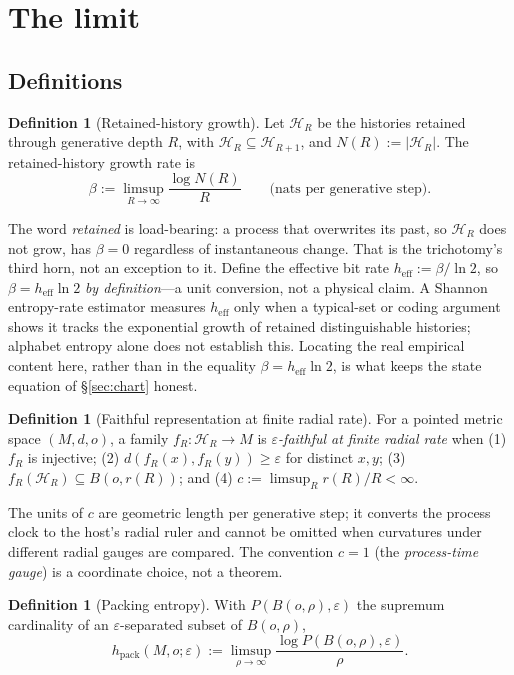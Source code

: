 \documentclass[11pt,reqno]{amsart}
\theoremstyle{plain}
\theoremstyle{definition}
\newtheorem{definition}[theorem]{Definition}
\newcommand{\hpack}{h_{\mathrm{pack}}}
\newcommand{\heff}{h_{\mathrm{eff}}}
\newcommand{\eps}{\varepsilon}
\begin{document}
\section{The limit}\label{sec:limit}

\subsection{Definitions}

\begin{definition}[Retained-history growth]
Let $\mathcal H_R$ be the histories retained through generative depth $R$, with $\mathcal H_R\subseteq\mathcal H_{R+1}$, and $N(R):=|\mathcal H_R|$. The retained-history growth rate is
\[
\beta:=\limsup_{R\to\infty}\frac{\log N(R)}{R}\qquad\text{(nats per generative step).}
\]
\end{definition}

The word \emph{retained} is load-bearing: a process that overwrites its past, so $\mathcal H_R$ does not grow, has $\beta=0$ regardless of instantaneous change. That is the trichotomy's third horn, not an exception to it. Define the effective bit rate $\heff:=\beta/\ln2$, so $\beta=\heff\ln2$ \emph{by definition}---a unit conversion, not a physical claim. A Shannon entropy-rate estimator measures $\heff$ only when a typical-set or coding argument shows it tracks the exponential growth of retained distinguishable histories; alphabet entropy alone does not establish this. Locating the real empirical content here, rather than in the equality $\beta=\heff\ln2$, is what keeps the state equation of \S\ref{sec:chart} honest.

\begin{definition}[Faithful representation at finite radial rate]
For a pointed metric space $(M,d,o)$, a family $f_R:\mathcal H_R\to M$ is \emph{$\eps$-faithful at finite radial rate} when (1) $f_R$ is injective; (2) $d(f_R(x),f_R(y))\ge\eps$ for distinct $x,y$; (3) $f_R(\mathcal H_R)\subseteq B(o,r(R))$; and (4) $c:=\limsup_R r(R)/R<\infty$.
\end{definition}

The units of $c$ are geometric length per generative step; it converts the process clock to the host's radial ruler and cannot be omitted when curvatures under different radial gauges are compared. The convention $c=1$ (the \emph{process-time gauge}) is a coordinate choice, not a theorem.

\begin{definition}[Packing entropy]
With $P(B(o,\rho),\eps)$ the supremum cardinality of an $\eps$-separated subset of $B(o,\rho)$,
\[
\hpack(M,o;\eps):=\limsup_{\rho\to\infty}\frac{\log P(B(o,\rho),\eps)}{\rho}.
\]
\end{definition}
\end{document}
